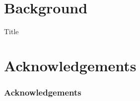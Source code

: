 \makeatletter
\def\beamer@andtitle{\unskip,  }%
\def\beamer@andinst{\\[1pt]}%
\makeatother

\maketitle

\section{Background}


\begin{frame}{Title}

\end{frame}


\section{Acknowledgements}


\begin{frame}
    \frametitle{Acknowledgements}
    \framesubtitle{}
\end{frame}


\bibliographpage
